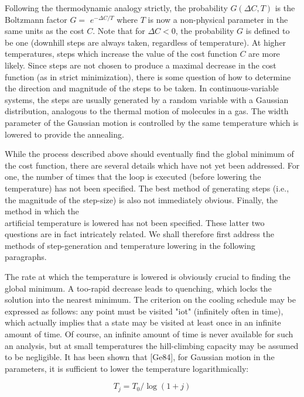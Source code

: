 \documentclass[10pt]{article}
\begin{document}
Following the thermodynamic analogy strictly, the probability $G(\Delta C, T)$ is the Boltzmann factor $G=$ $e^{-\Delta C / T}$ where $T$ is now a non-physical parameter in the same units as the cost $C$. Note that for $\Delta C<0$, the probability $G$ is defined to be one (downhill steps are always taken, regardless of temperature). At higher temperatures, steps which increase the value of the cost function $C$ are more likely. Since steps are not chosen to produce a maximal decrease in the cost function (as in strict minimization), there is some question of how to determine the direction and magnitude of the steps to be taken. In continuous-variable systems, the steps are usually generated by a random variable with a Gaussian distribution, analogous to the thermal motion of molecules in a gas. The width parameter of the Gaussian motion is controlled by the same temperature which is lowered to provide the annealing.

While the process described above should eventually find the global minimum of the cost function, there are several details which have not yet been addressed. For one, the number of times that the loop is executed (before lowering the temperature) has not been specified. The best method of generating steps (i.e., the magnitude of the step-size) is also not immediately obvious. Finally, the method in which the\\
artificial temperature is lowered has not been specified. These latter two questions are in fact intricately related. We shall therefore first address the methods of step-generation and temperature lowering in the following paragraphs.

The rate at which the temperature is lowered is obviously crucial to finding the global minimum. A too-rapid decrease leads to quenching, which locks the solution into the nearest minimum. The criterion on the cooling schedule may be expressed as follows: any point must be visited "iot" (infinitely often in time), which actually implies that a state may be visited at least once in an infinite amount of time. Of course, an infinite amount of time is never available for such an analysis, but at small temperatures the hill-climbing capacity may be assumed to be negligible. It has been shown that [Ge84], for Gaussian motion in the parameters, it is sufficient to lower the temperature logarithmically:


\begin{equation*}
T_{j}=T_{0} / \log (1+j) \tag{13.1}
\end{equation*}
\end{document}
